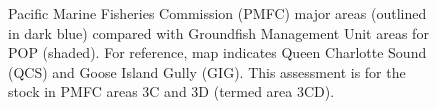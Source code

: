 \documentclass[11pt]{book}
\newcommand\bestfig[5]{ %
	\begin{figure}[htpb] %
	\centering
	\ifthenelse{ \isempty{#5} \OR \equal{#5}{eps} }
		{\texttt{[image: \#1.eps]}}
		{\setlength\fboxsep{0pt}
		 \setlength\fboxrule{0pt}
		 \fbox{\texttt{[image: \#1.\#5]}}}
	\ifthenelse{\isempty{#4}}
		{\caption[#2]{#2}}  %
		{\caption[#4]{#2}}  %
	\label{fig:#1}
	\end{figure}
        }
\begin{document}
 



\setcounter{secnumdepth}{3}    %

\renewcommand{\thesection}{\arabic{section}}   
\renewcommand{\thetable}{\arabic{table}}    
\renewcommand{\thefigure}{\arabic{figure}}  
\renewcommand{\theequation}{\arabic{equation}}

% 

\setcounter{page}{17}
\begin{figure}[htpb] %
\centering
\setlength\fboxsep{0pt}
\setlength\fboxrule{0pt}
\caption{Pacific Marine Fisheries Commission (PMFC) major areas (outlined in dark blue) compared with Groundfish Management Unit areas for POP (shaded). For reference, map indicates Queen Charlotte Sound (QCS) and Goose Island Gully (GIG). This assessment is for the stock in PMFC areas 3C and 3D (termed area 3CD).}
\label{fig:areas}
\end{figure}


\clearpage


\appendix           %

\end{document}
